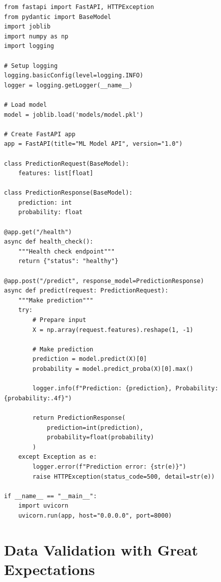 \begin{lstlisting}[style=python, caption=serve.py]
from fastapi import FastAPI, HTTPException
from pydantic import BaseModel
import joblib
import numpy as np
import logging

# Setup logging
logging.basicConfig(level=logging.INFO)
logger = logging.getLogger(__name__)

# Load model
model = joblib.load('models/model.pkl')

# Create FastAPI app
app = FastAPI(title="ML Model API", version="1.0")

class PredictionRequest(BaseModel):
    features: list[float]

class PredictionResponse(BaseModel):
    prediction: int
    probability: float

@app.get("/health")
async def health_check():
    """Health check endpoint"""
    return {"status": "healthy"}

@app.post("/predict", response_model=PredictionResponse)
async def predict(request: PredictionRequest):
    """Make prediction"""
    try:
        # Prepare input
        X = np.array(request.features).reshape(1, -1)

        # Make prediction
        prediction = model.predict(X)[0]
        probability = model.predict_proba(X)[0].max()

        logger.info(f"Prediction: {prediction}, Probability: {probability:.4f}")

        return PredictionResponse(
            prediction=int(prediction),
            probability=float(probability)
        )
    except Exception as e:
        logger.error(f"Prediction error: {str(e)}")
        raise HTTPException(status_code=500, detail=str(e))

if __name__ == "__main__":
    import uvicorn
    uvicorn.run(app, host="0.0.0.0", port=8000)
\end{lstlisting}

\section{Data Validation with Great Expectations}

